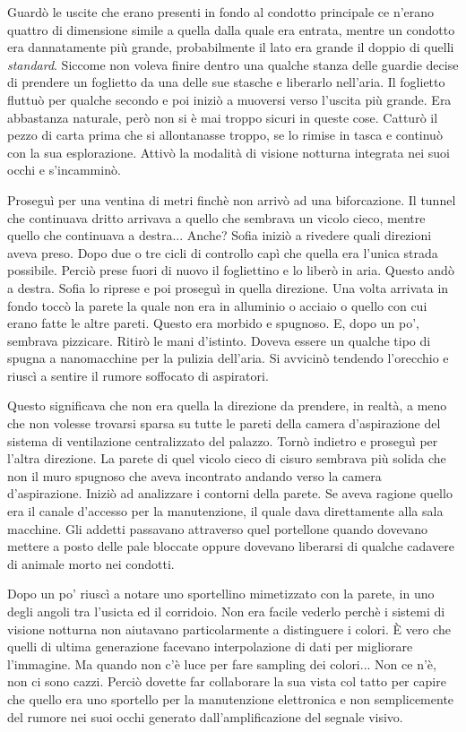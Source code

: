     Guardò le uscite che erano presenti in fondo al condotto principale ce n'erano quattro di dimensione simile a quella
    dalla quale era entrata, mentre un condotto era dannatamente più grande, probabilmente il lato era grande il doppio
    di quelli \emph{standard}. Siccome non voleva finire dentro una qualche stanza delle guardie decise di prendere un
    foglietto da una delle sue stasche e liberarlo nell'aria. Il foglietto fluttuò per qualche secondo e poi iniziò a
    muoversi verso l'uscita più grande. Era abbastanza naturale, però non si è mai troppo sicuri in queste cose. Catturò
    il pezzo di carta prima che si allontanasse troppo, se lo rimise in tasca e continuò con la sua esplorazione. Attivò
    la modalità di visione notturna integrata nei suoi occhi e s'incamminò.

    Proseguì per una ventina di metri finchè non arrivò ad una biforcazione. Il tunnel che continuava dritto arrivava a
    quello che sembrava un vicolo cieco, mentre quello che continuava a destra... Anche? Sofia iniziò a rivedere quali
    direzioni aveva preso. Dopo due o tre cicli di controllo capì che quella era l'unica strada possibile. Perciò prese
    fuori di nuovo il fogliettino e lo liberò in aria. Questo andò a destra. Sofia lo riprese e poi proseguì in quella
    direzione. Una volta arrivata in fondo toccò la parete la quale non era in alluminio o acciaio o quello con cui
    erano fatte le altre pareti. Questo era morbido e spugnoso. E, dopo un po', sembrava pizzicare. Ritirò le mani
    d'istinto. Doveva essere un qualche tipo di spugna a nanomacchine per la pulizia dell'aria. Si avvicinò tendendo
    l'orecchio e riuscì a sentire il rumore soffocato di aspiratori.

    Questo significava che non era quella la direzione da prendere, in realtà, a meno che non volesse trovarsi sparsa
    su tutte le pareti della camera d'aspirazione del sistema di ventilazione centralizzato del palazzo. Tornò indietro
    e proseguì per l'altra direzione. La parete di quel vicolo cieco di cisuro sembrava più solida che non il muro
    spugnoso che aveva incontrato andando verso la camera d'aspirazione. Iniziò ad analizzare i contorni della parete.
    Se aveva ragione quello era il canale d'accesso per la manutenzione, il quale dava direttamente alla sala macchine.
    Gli addetti passavano attraverso quel portellone quando dovevano mettere a posto delle pale bloccate oppure dovevano
    liberarsi di qualche cadavere di animale morto nei condotti.

    Dopo un po' riuscì a notare uno sportellino mimetizzato con la parete, in uno degli angoli tra l'usicta ed il
    corridoio. Non era facile vederlo perchè i sistemi di visione notturna non aiutavano particolarmente a distinguere i
    colori. È vero che quelli di ultima generazione facevano interpolazione di dati per migliorare l'immagine. Ma quando
    non c'è luce per fare sampling dei colori... Non ce n'è, non ci sono cazzi. Perciò dovette far collaborare la sua
    vista col tatto per capire che quello era uno sportello per la manutenzione elettronica e non semplicemente del
    rumore nei suoi occhi generato dall'amplificazione del segnale visivo.

